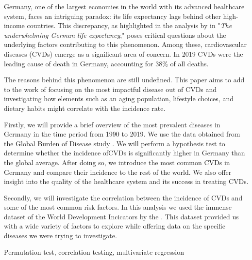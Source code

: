 
Germany, one of the largest economies in the world with its advanced healthcare 
system, faces an intriguing paradox: its life expectancy lags behind other 
high-income countries. This discrepancy, as highlighted in the analysis by 
\citet{Jasilionis2023} in "\textit{The underwhelming German life expectancy}," 
poses critical questions about the underlying factors contributing to this 
phenomenon. Among these, cardiovascular diseases (CVDs) emerge as a significant area 
of concern. In 2019 CVDs were the leading cause of death in Germany, accounting for 
38\% of all deaths. 

The reasons behind this phenomenon are still undefined. This paper aims to add to 
the work of \citet{Jasilionis2023} focusing on the most impactful disease out of 
CVDs and investigating how elements such as an aging population, lifestyle choices, 
and dietary habits might correlate with the incidence rate. 

Firstly, we will provide a brief overview of the most prevalent diseases in Germany 
in the time period from 1990 to 2019. We use the data obtained from the Global 
Burden of Disease study \citep{GBD2019}. We will perform a hypothesis test to 
determine whether the incidence ofCVDs is significantly higher in Germany than the 
global average. After doing so, we introduce the most common CVDs in Germany and 
compare their incidence to the rest of the world. We also offer insight into the 
quality of the healthcare system and its success in treating CVDs.

Secondly, we will investigate the correlation between the incidence of CVDs and 
some of the most common risk factors. In this analysis we used the immense dataset of 
the World Development Incicators by the \citet{worldbank_wdi}. This dataset provided 
us with a wide variety of factors to explore while offering data on the specific 
diseases we were trying to investigate.

Permutation test, correlation testing, multivariate regression